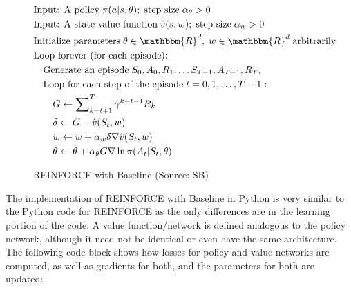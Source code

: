 \begin{figure}
\small
\begin{pseudocodebox}
\vspace{-\baselineskip}
\begin{align*}
& \text{Input: A policy}\;\pi(a | s, \theta);\;\text{step size}\; \alpha_\theta > 0 \\
& \text{Input: A state-value function}\;\hat{v}(s, w);\;\text{step size}\; \alpha_w > 0 \\
& \text{Initialize parameters}\; \theta \in \mathbbm{R}^d,\; w \in \mathbbm{R}^d\;\text{arbitrarily} \\
& \text{Loop forever (for each episode):} \\
& \quad \text{Generate an episode}\; S_0, A_0, R_1, \ldots S_{T-1}, A_{T-1}, R_T, \hspace{1in} \\
& \quad \text{Loop for each step of the episode}\;t=0, 1, \ldots, T-1:\\
& \quad \quad G \leftarrow \sum\nolimits_{k=t+1}^T \gamma^{k - t - 1}R_k \\
& \quad \quad \delta \leftarrow G - \hat{v}(S_t, w) \\
& \quad \quad w \leftarrow w + \alpha_w \delta \nabla \hat{v}(S_t, w) \\
& \quad \quad \theta \leftarrow \theta + \alpha_\theta G \nabla \ln \pi(A_t | S_t, \theta)
\end{align*}
\end{pseudocodebox}
\caption[REINFORCE with Baseline]{REINFORCE with Baseline (Source: SB)}
\label{fig:reinforcebaseline}
\end{figure}

The implementation of REINFORCE with Baseline in Python is very similar to the Python code for REINFORCE as the only differences are in the learning portion of the code. A value function/network is defined analogous to the policy network, although it need not be identical or even have the same architecture. The following code block shows how losses for policy and value networks are computed, as well as gradients for both, and the parameters for both are updated:

